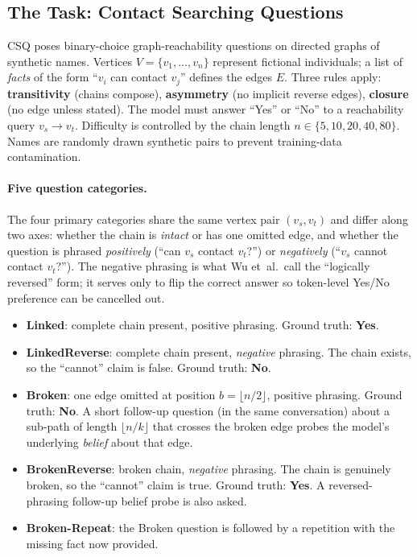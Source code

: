 \documentclass[11pt]{article}
\begin{document}
\subsection{The Task: Contact Searching Questions}

CSQ poses binary-choice graph-reachability questions on directed graphs of synthetic names.
Vertices $V=\{v_1,\dots,v_n\}$ represent fictional individuals; a list of \emph{facts} of
the form ``$v_i$ can contact $v_j$'' defines the edges $E$. Three rules apply:
\textbf{transitivity} (chains compose), \textbf{asymmetry} (no implicit reverse edges),
\textbf{closure} (no edge unless stated). The model must answer ``Yes'' or ``No'' to a
reachability query $v_s \to v_t$. Difficulty is controlled by the chain length
$n\in\{5,10,20,40,80\}$. Names are randomly drawn synthetic pairs to prevent training-data
contamination.

\paragraph{Five question categories.}
The four primary categories share the same vertex pair $(v_s,v_t)$ and differ along two
axes: whether the chain is \emph{intact} or has one omitted edge, and whether the question
is phrased \emph{positively} (``can $v_s$ contact $v_t$?'') or \emph{negatively}
(``$v_s$ cannot contact $v_t$?''). The negative phrasing is what Wu et~al.\ call the
``logically reversed'' form; it serves only to flip the correct answer so token-level Yes/No
preference can be cancelled out.
\begin{itemize}[leftmargin=*,nosep,topsep=2pt]
\item \textbf{Linked}: complete chain present, positive phrasing. Ground truth: \textbf{Yes}.
\item \textbf{LinkedReverse}: complete chain present, \emph{negative} phrasing. The chain
exists, so the ``cannot'' claim is false. Ground truth: \textbf{No}.
\item \textbf{Broken}: one edge omitted at position $b{=}\lfloor n/2\rfloor$, positive
phrasing. Ground truth: \textbf{No}. A short follow-up question (in the same conversation)
about a sub-path of length $\lfloor n/k\rfloor$ that crosses the broken edge probes the
model's underlying \emph{belief} about that edge.
\item \textbf{BrokenReverse}: broken chain, \emph{negative} phrasing. The chain is genuinely
broken, so the ``cannot'' claim is true. Ground truth: \textbf{Yes}. A reversed-phrasing
follow-up belief probe is also asked.
\item \textbf{Broken-Repeat}: the Broken question is followed by a repetition with the
missing fact now provided.
\end{itemize}
\end{document}
